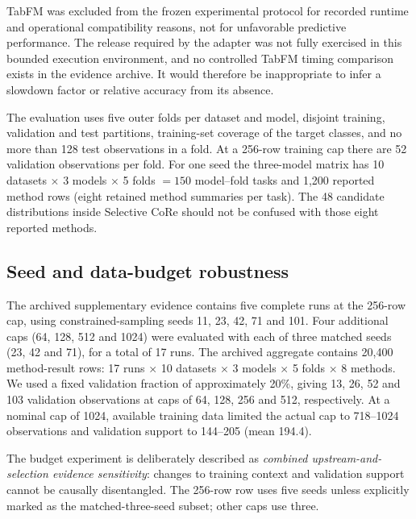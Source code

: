 \documentclass[a4paper,fleqn]{cas-sc}
\begin{document}
TabFM was excluded from the frozen experimental protocol for recorded runtime and operational compatibility reasons, not for unfavorable predictive performance. The release required by the adapter was not fully exercised in this bounded execution environment, and no controlled TabFM timing comparison exists in the evidence archive. It would therefore be inappropriate to infer a slowdown factor or relative accuracy from its absence.

The evaluation uses five outer folds per dataset and model, disjoint training, validation and test partitions, training-set coverage of the target classes, and no more than 128 test observations in a fold. At a 256-row training cap there are 52 validation observations per fold. For one seed the three-model matrix has 10 datasets $\times$ 3 models $\times$ 5 folds $=150$ model--fold tasks and 1,200 reported method rows (eight retained method summaries per task). The 48 candidate distributions inside Selective CoRe should not be confused with those eight reported methods.

\subsection{Seed and data-budget robustness}
The archived supplementary evidence contains five complete runs at the 256-row cap, using constrained-sampling seeds 11, 23, 42, 71 and 101. Four additional caps (64, 128, 512 and 1024) were evaluated with each of three matched seeds (23, 42 and 71), for a total of 17 runs. The archived aggregate contains 20,400 method-result rows: 17 runs $\times$ 10 datasets $\times$ 3 models $\times$ 5 folds $\times$ 8 methods. We used a fixed validation fraction of approximately 20\%, giving 13, 26, 52 and 103 validation observations at caps of 64, 128, 256 and 512, respectively. At a nominal cap of 1024, available training data limited the actual cap to 718--1024 observations and validation support to 144--205 (mean 194.4).

The budget experiment is deliberately described as \emph{combined upstream-and-selection evidence sensitivity}: changes to training context and validation support cannot be causally disentangled. The 256-row row uses five seeds unless explicitly marked as the matched-three-seed subset; other caps use three.
\end{document}
